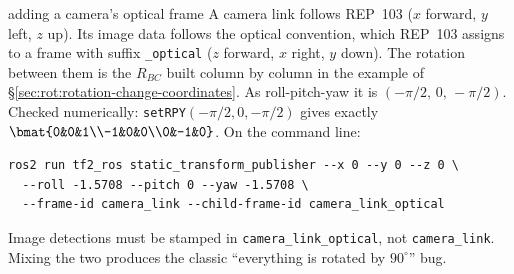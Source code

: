 \begin{example}{adding a camera's optical frame}
A camera link follows REP~103 ($x$ forward, $y$ left, $z$ up). Its image data follows the optical convention, which REP~103 assigns to a frame with suffix \texttt{\_optical} ($z$ forward, $x$ right, $y$ down). The rotation between them is the $R_{BC}$ built column by column in the example of \S\ref{sec:rot:rotation-change-coordinates}. As roll-pitch-yaw it is $(-\pi/2,\,0,\,-\pi/2)$. Checked numerically: \texttt{setRPY}$(-\pi/2,0,-\pi/2)$ gives exactly $\bmat{0&0&1\\-1&0&0\\0&-1&0}$. On the command line:
\begin{verbatim}
ros2 run tf2_ros static_transform_publisher --x 0 --y 0 --z 0 \
  --roll -1.5708 --pitch 0 --yaw -1.5708 \
  --frame-id camera_link --child-frame-id camera_link_optical
\end{verbatim}
Image detections must be stamped in \texttt{camera\_link\_optical}, not \texttt{camera\_link}. Mixing the two produces the classic ``everything is rotated by $90^\circ$'' bug.
\end{example}
